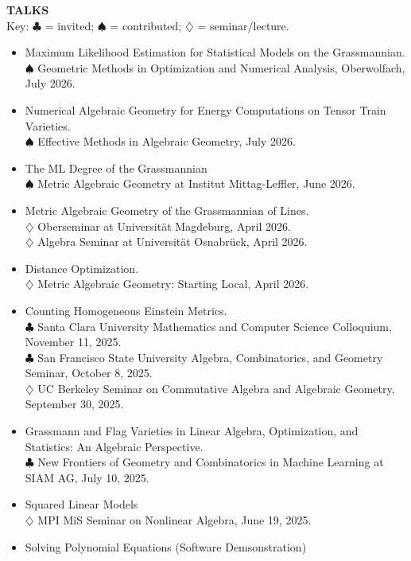 \documentclass[11pt]{article}
\newcommand{\hdr}[1]{\textcolor{blue(ryb)}{\textbf{#1}}}
\begin{document}
\bigskip

\hdr{TALKS}\\
Key: $\clubsuit$ = invited; $\spadesuit$ = contributed; $\diamondsuit$ = seminar/lecture.
\begin{itemize}
\item Maximum Likelihood Estimation for Statistical Models on the Grassmannian. \\
  $\spadesuit$   Geometric Methods in Optimization and Numerical Analysis, Oberwolfach, July 2026.
\item Numerical Algebraic Geometry for Energy Computations on Tensor Train Varieties.\\
  $\spadesuit$ Effective Methods in Algebraic Geometry, July 2026.
\item The ML Degree of the Grassmannian\\
  $\spadesuit$ Metric Algebraic Geometry at Institut Mittag-Leffler, June 2026. 
\item Metric Algebraic Geometry of the Grassmannian of Lines.\\
  $\diamondsuit$ Oberseminar at Universität Magdeburg, April 2026.\\
  $\diamondsuit$ Algebra Seminar at Universität Osnabrück, April 2026.
\item Distance Optimization.\\
  $\diamondsuit$ Metric Algebraic Geometry: Starting Local, April 2026. 
\item Counting Homogeneous Einstein Metrics.\\
  $\clubsuit$ Santa Clara University Mathematics and Computer Science Colloquium, November 11, 2025. \\
  $\clubsuit$ San Francisco State University Algebra, Combinatorics, and Geometry Seminar, October 8, 2025.\\
  $\diamondsuit$ UC Berkeley Seminar on Commutative Algebra and Algebraic Geometry, September 30, 2025. \\
\item Grassmann and Flag Varieties in Linear Algebra, Optimization, and Statistics: An Algebraic Perspective.\\
  $\clubsuit$ New Frontiers of Geometry and Combinatorics in Machine Learning at SIAM AG, July 10, 2025.
\item Squared Linear Models\\
  $\diamondsuit$ MPI MiS Seminar on Nonlinear Algebra, June 19, 2025.
\item Solving Polynomial Equations (Software Demsonstration)\\

\end{itemize}
\end{document}
